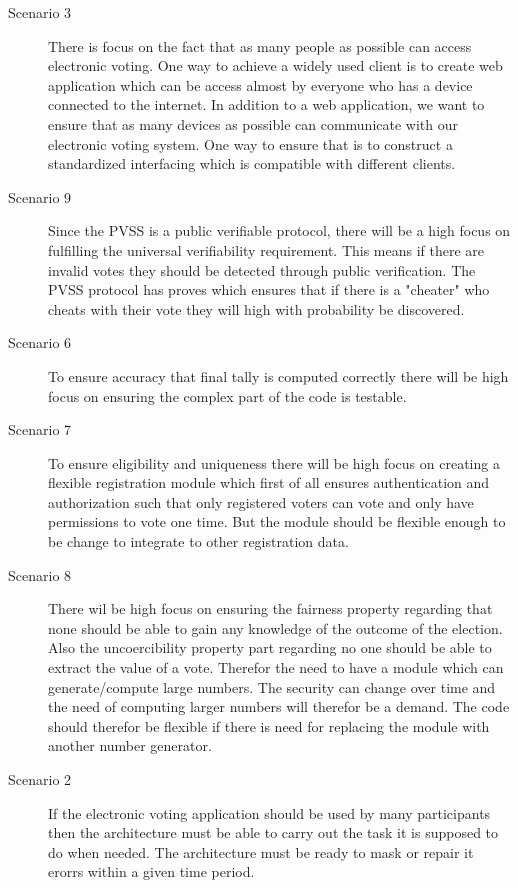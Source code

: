 \begin{description}
    \item [Scenario 3]
       There is focus on the fact that as many people as possible can access electronic voting. One way to achieve a widely used client is to create web application which can be access almost by everyone who has a device connected to the internet. In addition to a web application, we want to ensure that as many devices as possible can communicate with our electronic voting system. One way to ensure that is to construct a standardized interfacing which is compatible with different clients.
    
     \item [Scenario 9]
         Since the PVSS is a public verifiable protocol, there will be a high focus on fulfilling the universal verifiability requirement. This means if there are invalid votes they should be detected through public verification. The PVSS protocol has proves which ensures that if there is a "cheater" who cheats with their vote they will high with probability be discovered.
    
    \item [Scenario 6]
        To ensure accuracy that final tally is computed correctly there will be high focus on ensuring the complex part of the code is testable. 
    
    \item [Scenario 7]    
        To ensure eligibility and uniqueness there will be high focus on creating a flexible registration module which first of all ensures authentication and authorization such that only registered voters can vote and only have permissions to vote one time. But the module should be flexible enough to be change to integrate to other registration data. 
        
     \item [Scenario 8]    
        There wil be high focus on ensuring the fairness property regarding that none should be able to gain any knowledge of the outcome of the election. Also the uncoercibility property part regarding no one should be able to extract the value of a vote. Therefor the need to have a module which can generate/compute large numbers. The security can change over time and the need of computing larger numbers will therefor be a demand. The code should therefor be flexible if there is need for replacing the module with another number generator.       
     
    \item [Scenario 2]
        If the electronic voting application should be used by many participants then the architecture must be able to carry out the task it is supposed to do when needed. The architecture must be ready to mask or repair it erorrs within a given time period.
     

\end{description}
